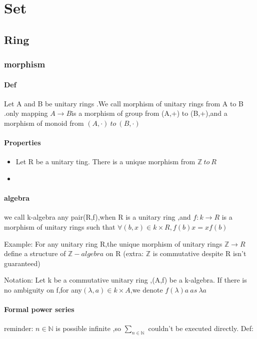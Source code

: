 \documentclass{book}
\begin{document}
\tableofcontents
\part{Set}
\chapter{Ring}
\section{morphism}
    \subsection*{Def}
    \indent Let A and B be unitary rings .We call morphism of unitary rings from A to B .only mapping $A\rightarrow B$is a morphism of group from (A,+) to (B,+),and a morphism of monoid from $(A,\cdot)\ to\ (B,\cdot)$
    \subsection*{Properties}
    \begin{itemize}
        \item Let R be a unitary ting. There is a unique morphism from $\mathbb{Z}\ to\ R$
        \item 
    \end{itemize}
\subsection*{algebra}

we call k-algebra any pair(R,f),when R is a unitary ring ,and $f:k\rightarrow R$ is a morphism of unitary rings such that $\forall (b,x)\in k\times R,f(b)x=xf(b)$

Example:    For any unitary ring R,the unique morphism of unitary rings $\mathbb{Z}\rightarrow R$ define a structure of $\mathbb{Z}-algebra$ on R (extra: $\mathbb{Z}$ is commutative despite R isn't guaranteed)

Notation: Let k be a commutative unitary ring ,(A,f) be a k-algebra. If there is no ambiguity on f,for any$ (\lambda,a )\in k\times A$,we denote $f(\lambda)a\ as\ \lambda a$
\subsection*{Formal power series}
reminder: $n\in\mathbb{N}$ is possible infinite ,so $\sum\limits_{n\in \mathbb{N}}$ couldn't be executed directly.
Def:
\end{document}
